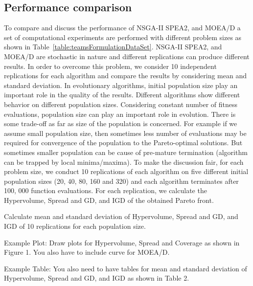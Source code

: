 \documentclass{sig-alternate}
\begin{document}

\subsection{Performance comparison}
To compare and discuss the performance of NSGA-II SPEA2, and MOEA/D a set of computational experiments are performed   with different problem sizes as shown in Table~\ref{table:teamsFormulationDataSet}. NSGA-II SPEA2, and MOEA/D are stochastic in nature and different replications can produce different results. In order to overcome this problem, we consider 10 independent replications for each algorithm and compare the results by considering mean and standard deviation. 
In evolutionary algorithms, initial population size play an important role in the quality of the results. Different algorithms show different behavior on different population sizes. Considering constant number of ﬁtness evaluations, population size can play an important role in evolution. There is some trade-off as far as size of the population is concerned. For example if we assume small population size, then sometimes less number of evaluations may be required for convergence of the population to the Pareto-optimal solutions. But sometimes smaller population can be cause of pre-mature termination (algorithm can be trapped by local minima/maxima). To make the discussion fair, for each problem size, we conduct 10 replications of each algorithm on ﬁve different initial population sizes (20, 40, 80, 160 and 320) and each algorithm terminates after 100, 000 function evaluations. For each replication, we calculate the Hypervolume, Spread and GD, and IGD of the obtained Pareto front.

Calculate mean and standard deviation of Hypervolume, Spread and GD, and IGD of 10 replications for each population size.


Example Plot: Draw plots for Hypervolume, Spread and Coverage as shown in Figure 1. You also have to include  curve for MOEA/D.

Example Table: You also need to have tables for  mean and standard deviation of Hypervolume, Spread and GD, and IGD as shown in Table 2.
\end{document}
